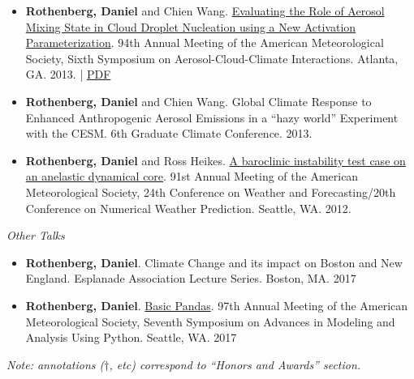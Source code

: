 \documentclass[11pt,letterpaper]{article}
\begin{document}
\begin{itemize}[itemindent=-10pt]
 \item \textbf{Rothenberg, Daniel} and Chien Wang. \href{https://ams.confex.com/ams/94Annual/webprogram/Paper240205.html}{Evaluating the Role of Aerosol Mixing State in Cloud Droplet Nucleation using a New Activation Parameterization}. 94th Annual Meeting of the American Meteorological Society, Sixth Symposium on Aerosol-Cloud-Climate Interactions. Atlanta, GA. 2013. | \href{https://figshare.com/articles/AMS_2014_Evaluating_the_Role_of_Aerosol_Mixing_State_in_Cloud_Droplet_Nucleation_towards_Developing_a_New_Activation_Parameterization/918655}{PDF}

 \item \textbf{Rothenberg, Daniel} and Chien Wang. Global Climate Response to Enhanced Anthropogenic Aerosol Emissions in a ``hazy world'' Experiment with the CESM. 6th Graduate Climate Conference. 2013.

 \item \textbf{Rothenberg, Daniel} and Ross Heikes. \href{https://ams.confex.com/ams/91Annual/webprogram/Paper180796.html}{A baroclinic instability test case on an anelastic dynamical core}. 91st Annual Meeting of the American Meteorological Society, 24th Conference on Weather and Forecasting/20th Conference on Numerical Weather Prediction. Seattle, WA. 2012.
\end{itemize}

\bigskip
\emph{Other Talks}
\medskip
\begin{itemize}[itemindent=-10pt]

\item \textbf{Rothenberg, Daniel}. Climate Change and its impact on Boston and New England. Esplanade Association Lecture Series. Boston, MA. 2017

\item \textbf{Rothenberg, Daniel}. \href{https://github.com/darothen/python_for_climate_data_science/blob/master/basic_pandas.ipynb}{Basic Pandas}. 97th Annual Meeting of the American Meteorological Society, Seventh Symposium on Advances in Modeling and Analysis Using Python. Seattle, WA. 2017

\end{itemize}

\vspace{0.1cm}

\emph{\small{Note: annotations ($\dagger$, etc) correspond to ``Honors and Awards'' section.}}

\end{document}
